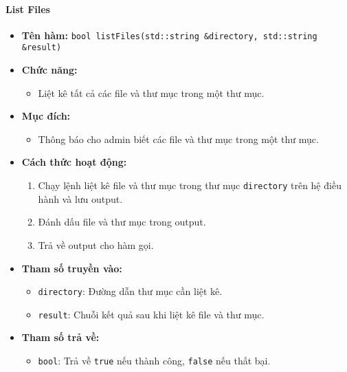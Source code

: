 \paragraph{List Files}
\begin{itemize}
    \item \textbf{Tên hàm:} \texttt{bool listFiles(std::string \&directory, std::string \&result)}
    \item \textbf{Chức năng:}
    \begin{itemize}
        \item Liệt kê tất cả các file và thư mục trong một thư mục.
    \end{itemize}
    \item \textbf{Mục đích:}
    \begin{itemize}
        \item Thông báo cho admin biết các file và thư mục trong một thư mục.
    \end{itemize}
    \item \textbf{Cách thức hoạt động:}
    \begin{enumerate}
        \item Chạy lệnh liệt kê file và thư mục trong thư mục \texttt{directory} trên hệ điều hành và lưu output.
        \item Đánh dấu file và thư mục trong output.
        \item Trả về output cho hàm gọi.
    \end{enumerate}
    \item \textbf{Tham số truyền vào:}
    \begin{itemize}
        \item \texttt{directory}: Đường dẫn thư mục cần liệt kê.
        \item \texttt{result}: Chuỗi kết quả sau khi liệt kê file và thư mục.
    \end{itemize}
    \item \textbf{Tham số trả về:}
    \begin{itemize}
        \item \texttt{bool}: Trả về \texttt{true} nếu thành công, \texttt{false} nếu thất bại.
    \end{itemize}
\end{itemize}

